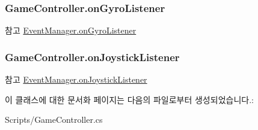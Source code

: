 \subsubsection[{on\+Gyro\+Listener}]{ Game\+Controller.\+on\+Gyro\+Listener}\label{class_game_controller_ae051ab28fdc0f6bf06d1c5fbb4ad3f21}
\begin{DoxySeeAlso}{참고}
\hyperlink{class_event_manager_a31f1da96e98896421b0026df5ce01623}{Event\+Manager.\+on\+Gyro\+Listener} 
\end{DoxySeeAlso}
\hypertarget{class_game_controller_a4ac337d799821aba5064e4e91c565eb9}{}
\subsubsection[{on\+Joystick\+Listener}]{ Game\+Controller.\+on\+Joystick\+Listener}\label{class_game_controller_a4ac337d799821aba5064e4e91c565eb9}
\begin{DoxySeeAlso}{참고}
\hyperlink{class_event_manager_ab148217093b03a8cd7c962a11195c83a}{Event\+Manager.\+on\+Joystick\+Listener} 
\end{DoxySeeAlso}


이 클래스에 대한 문서화 페이지는 다음의 파일로부터 생성되었습니다.\+:\begin{DoxyCompactItemize}
\item 
Scripts/Game\+Controller.\+cs\end{DoxyCompactItemize}
